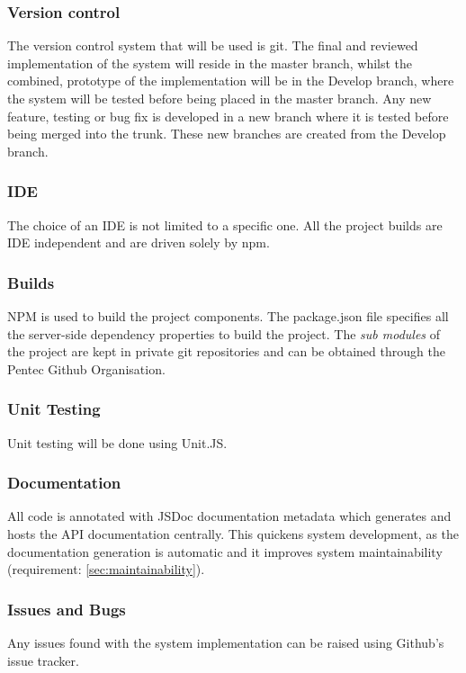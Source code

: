 \subsubsection{Version control}
The version control system that will be used is git. The final and reviewed implementation of the system will reside in the master branch, whilst the combined, prototype of the implementation will be in the Develop branch, where the system will be tested before being placed in the master branch. Any new feature, testing or bug fix is developed in a new branch where it is tested before being merged into the trunk. These new branches are created from the Develop branch.

\subsubsection{IDE}
The choice of an IDE is not limited to a specific one. All the project builds are IDE independent and are driven solely by npm.


\subsubsection{Builds}
NPM is used to build the project components. The package.json file specifies all the server-side dependency properties to build the project. The \textit{sub modules} of the project are kept in private git repositories and can be obtained through the Pentec Github Organisation.

\subsubsection{Unit Testing}
Unit testing will be done using Unit.JS.

\subsubsection{Documentation}
All code is annotated with JSDoc documentation metadata which generates and hosts the API documentation centrally. This quickens system development, as the documentation generation is automatic and it improves system maintainability (requirement: \ref{sec:maintainability}).

\subsubsection{Issues and Bugs}
Any issues found with the system implementation can  be raised using Github's issue tracker.